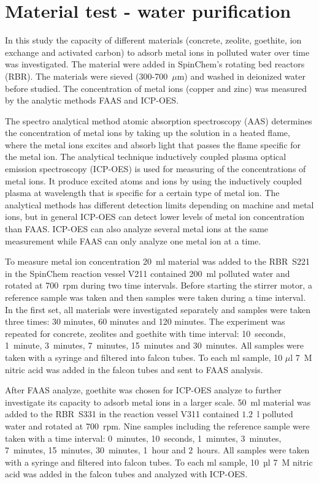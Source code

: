 \section{Material test - water purification}
In this study the capacity of different materials (concrete, zeolite, goethite,
ion exchange and activated carbon) to adsorb metal ions in polluted water over
time was investigated. The material were added in SpinChem\textsuperscript{\textregistered}'s rotating
bed reactors (RBR). The materials were sieved (300-700~$\mu$m) and washed in
deionized water before studied. The concentration of metal ions (copper and
zinc) was measured by the analytic methods FAAS and ICP-OES.

The spectro analytical method atomic absorption spectroscopy (AAS) determines the concentration of metal ions by taking up the solution in a heated flame, where the metal ions excites and absorb light that passes the flame specific for the metal ion.\cite{ford} The analytical technique inductively coupled plasma optical emission spectroscopy (ICP-OES) is used for measuring of the concentrations of metal ions. It produce excited atoms and ions by using the inductively coupled plasma at wavelength that is specific for a certain type of metal ion. The analytical methods has different detection limits depending on machine and metal ions, but in general ICP-OES can detect lower levels of metal ion concentration than FAAS. ICP-OES can also analyze several metal ions at the same measurement while FAAS can only analyze one metal ion at a time\cite{boss}\cite{fassel}. 

To measure metal ion concentration 20~ml material was added to the RBR~S221 in the SpinChem\textsuperscript{\textregistered} reaction vessel V211 contained 200~ml polluted water and rotated at 700~rpm during two time intervals. Before starting the stirrer motor, a reference sample was taken and then samples were taken during a time interval. In the first set, all materials were investigated separately and samples were taken three times: 30 minutes, 60 minutes and 120 minutes. The experiment was repeated for concrete, zeolites and goethite with time interval: 10~seconds, 1~minute, 3~minutes, 7~minutes, 15~minutes and 30~minutes. All samples were taken with a syringe and filtered into falcon tubes. To each ml sample, 10 $\mu$l 7~M nitric acid was added in the falcon tubes and sent to FAAS analysis. 

After FAAS analyze, goethite was chosen for ICP-OES analyze to further investigate its capacity to adsorb metal ions in a larger scale. 50~ml material was added to the RBR~S331 in the reaction vessel V311 contained $1.2$~l polluted water and rotated at 700~rpm. Nine samples including the reference sample were taken with a time interval: 0~minutes, 10~seconds, 1~minutes, 3~minutes, 7~minutes, 15~minutes, 30~minutes, 1~hour and 2~hours. All samples were taken with a syringe and filtered into falcon tubes. To each ml sample, 10~µl 7~M nitric acid was added in the falcon tubes and analyzed with ICP-OES. 

